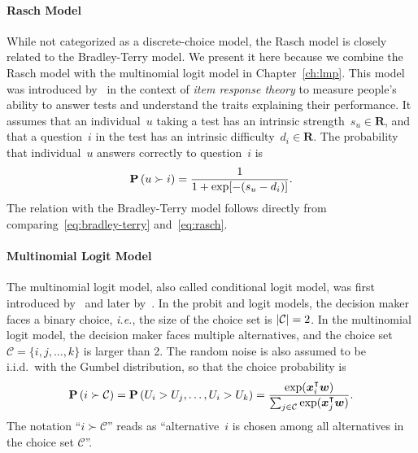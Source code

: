 \paragraph{Rasch Model}
While not categorized as a discrete-choice model, the Rasch model is closely related to the Bradley-Terry model.
We present it here because we combine the Rasch model with the multinomial logit model in Chapter~\ref{ch:lmp}.
This model was introduced by~\citet{rasch1993probabilistic} in the context of \emph{item response theory} to measure people's ability to answer tests and understand the traits explaining their performance.
It assumes that an individual~$u$ taking a test has an intrinsic strength~$s_u \in \mathbf{R}$, and that a question~$i$ in the test has an intrinsic difficulty~$d_i \in \mathbf{R}$.
The probability that individual~$u$ answers correctly to question~$i$ is
\begin{equation}
	\label{eq:rasch}
	\mathbf{P}\left( u \succ i \right) = \frac{1}{1 + \exp[-(s_u - d_i)]}.
\end{equation}
The relation with the Bradley-Terry model follows directly from comparing~\eqref{eq:bradley-terry} and~\eqref{eq:rasch}.

\paragraph{Multinomial Logit Model}

The multinomial logit model, also called conditional logit model, was first introduced by~\citet{luce1959individual} and later by~\citet{mcfadden1973conditional}.
In the probit and logit models, the decision maker faces a binary choice, \textit{i.e.}, the size of the choice set is $\lvert\mathcal{C}\rvert = 2$.
In the multinomial logit model, the decision maker faces multiple alternatives, and the choice set $\mathcal{C} = \{ i, j, \ldots, k \}$ is larger than 2.
The random noise is also assumed to be i.i.d.\ with the Gumbel distribution, so that the choice probability is
\begin{equation}
	\label{eq:multinomiallogit}
	\mathbf{P}\left( i \succ \mathcal{C} \right) = \mathbf{P}\left( U_i > U_j, \ldots, U_i > U_k \right) = \frac{\exp(\bm{x}_i^\intercal \bm{w})}{\sum_{j \in \mathcal{C}} \exp(\bm{x}_j^\intercal \bm{w})}.
\end{equation}
The notation ``$i \succ \mathcal{C}$'' reads as ``alternative~$i$ is chosen among all alternatives in the choice set $\mathcal{C}$''.

